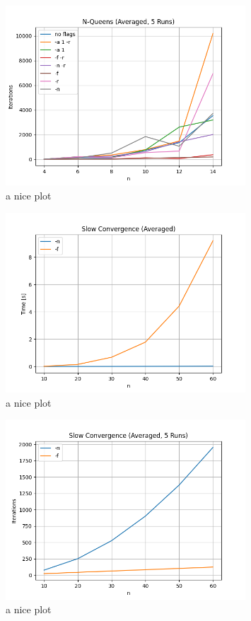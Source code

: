 \begin{figure}[ht]
	\centering
	\includegraphics[width=0.8\textwidth]{./Problems/queens/plots/iterations.png}
	\caption{a nice plot}
	\label{fig:queens:iterations}
\end{figure}



\begin{figure}[ht]
	\centering
	\includegraphics[width=0.8\textwidth]{./Problems/slow_convergence/plots/time.png}
	\caption{a nice plot}
	\label{fig:slow:time}
\end{figure}


\begin{figure}[ht]
	\centering
	\includegraphics[width=0.8\textwidth]{./Problems/slow_convergence/plots/iterations.png}
	\caption{a nice plot}
	\label{fig:slow:iterations}
\end{figure}



